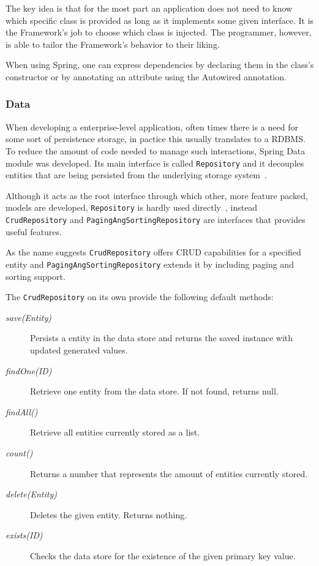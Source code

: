 The key idea is that for the most part an application does not need to know which specific class is provided as long as it implements some given interface. It is the Framework's job to choose which class is injected. The programmer, however, is able to tailor the Framework's behavior to their liking.

When using Spring, one can express dependencies by declaring them in the class's constructor or by annotating an attribute using the Autowired annotation\cite{springdi}.

\subsubsection{Data}
When developing a enterprise-level application, often times there is a need for some sort of persistence storage, in pactice this usually translates to a \gls{RDBMS}. To reduce the amount of code needed to manage such interactions, Spring Data module was developed. Its main interface is called \texttt{Repository} and it decouples entities that are being persisted from the underlying storage system~\cite{springdata}.

Although it acts as the root interface through which other, more feature packed, models are developed, \texttt{Repository} is hardly used directly~\cite{springdatadoc}, instead \texttt{CrudRepository} and \texttt{PagingAngSortingRepository} are interfaces that provides useful features.

As the name suggests \texttt{CrudRepository} offers \gls{CRUD} capabilities for a specified entity and \texttt{PagingAngSortingRepository} extends it by including paging and sorting support.

The \texttt{CrudRepository} on its own provide the following default methods:
\begin{description}
\item[\textit{save(Entity)}] Persists a entity in the data store and returns the saved instance with updated generated values.
\item[\textit{findOne(ID)}] Retrieve one entity from the data store. If not found, returns null.
\item[\textit{findAll()}] Retrieve all entities currently stored as a list.
\item[\textit{count()}] Returns a number that represents the amount of entities currently stored.
\item[\textit{delete(Entity)}] Deletes the given entity. Returns nothing.
\item[\textit{exists(ID)}] Checks the data store for the existence of the given primary key value.
\end{description}

